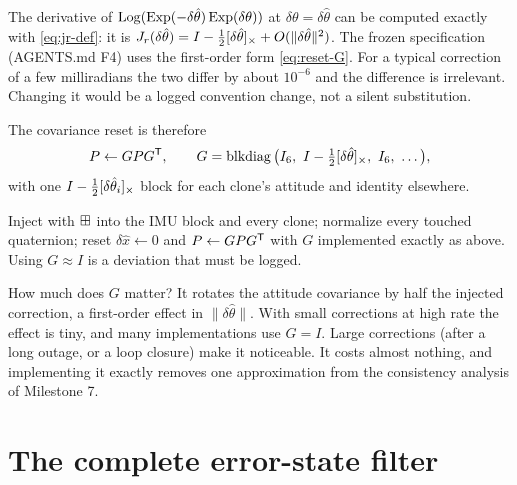 \begin{remark}
The derivative of $\operatorname{Log}(\operatorname{Exp}(-\delta\hat\theta)\operatorname{Exp}(\delta\theta))$ at $\delta\theta = \delta\hat\theta$ can be computed exactly with \eqref{eq:jr-def}: it is
$J_r(\delta\hat\theta) = I - \tfrac12[\delta\hat\theta]_{\times} + O(\|\delta\hat\theta\|^2)$. The frozen specification (AGENTS.md F4) uses the first-order form \eqref{eq:reset-G}. For a
typical correction of a few milliradians the two differ by about $10^{-6}$ and the difference is irrelevant. Changing it would be a logged
convention change, not a silent substitution.
\end{remark}

The covariance reset is therefore
\begin{equation}
  P \gets G P G^{\mathsf{T}}, \qquad G = \operatorname{blkdiag}\big(I_6,\ I - \tfrac12[\delta\hat\theta]_{\times},\ I_6,\ \ldots\big),
\end{equation}
with one $I - \tfrac12[\delta\hat\theta_i]_{\times}$ block for each clone's attitude and identity elsewhere.

\begin{convention}
Inject with $\boxplus$ into the IMU block and every clone; normalize every touched quaternion; reset $\delta\hat x \gets 0$ and $P \gets GPG^{\mathsf{T}}$ with $G$
implemented exactly as above. Using $G \approx I$ is a deviation that must be logged.
\end{convention}

How much does $G$ matter? It rotates the attitude covariance by half the injected correction, a first-order effect in $\|\delta\hat\theta\|$. With small
corrections at high rate the effect is tiny, and many implementations use $G = I$. Large corrections (after a long outage, or a loop closure) make it
noticeable. It costs almost nothing, and implementing it exactly removes one approximation from the consistency analysis of Milestone 7.

\section{The complete error-state filter}

